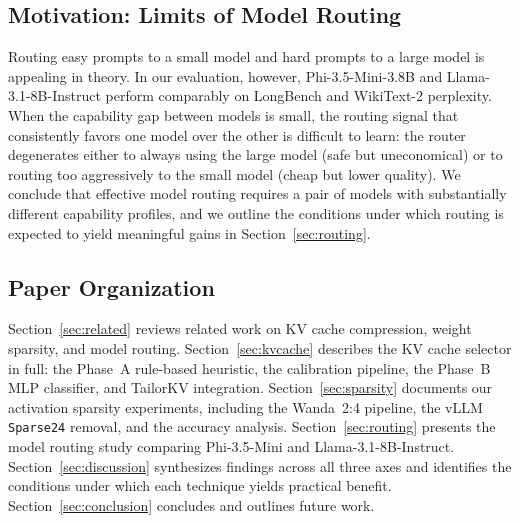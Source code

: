 \documentclass[conference]{IEEEtran}
\begin{document}
\subsection{Motivation: Limits of Model Routing}
\label{sec:intro:routing}

Routing easy prompts to a small model and hard prompts to a large model is
appealing in theory.
In our evaluation, however, Phi-3.5-Mini-3.8B and Llama-3.1-8B-Instruct
perform comparably on LongBench and WikiText-2 perplexity.
When the capability gap between models is small, the routing signal that
consistently favors one model over the other is difficult to learn: the router
degenerates either to always using the large model (safe but uneconomical) or
to routing too aggressively to the small model (cheap but lower quality).
We conclude that effective model routing requires a pair of models with
substantially different capability profiles, and we outline the conditions
under which routing is expected to yield meaningful gains in
Section~\ref{sec:routing}.

\subsection{Paper Organization}
\label{sec:intro:organization}

Section~\ref{sec:related} reviews related work on KV cache compression, weight
sparsity, and model routing.
Section~\ref{sec:kvcache} describes the KV cache selector in full: the
Phase~A rule-based heuristic, the calibration pipeline, the Phase~B MLP
classifier, and TailorKV integration.
Section~\ref{sec:sparsity} documents our activation sparsity experiments,
including the Wanda~2:4 pipeline, the vLLM \texttt{Sparse24} removal, and the
accuracy analysis.
Section~\ref{sec:routing} presents the model routing study comparing
Phi-3.5-Mini and Llama-3.1-8B-Instruct.
Section~\ref{sec:discussion} synthesizes findings across all three axes and
identifies the conditions under which each technique yields practical benefit.
Section~\ref{sec:conclusion} concludes and outlines future work.
\end{document}
